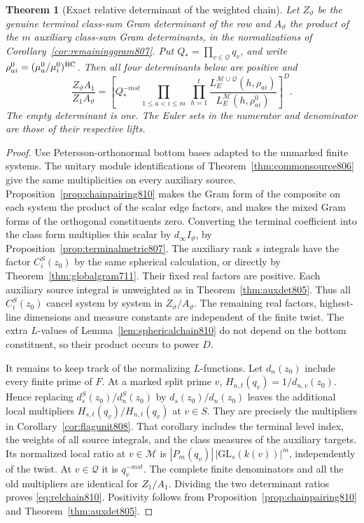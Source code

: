 \documentclass[a4paper,11pt]{article}
\newtheorem{theorem}[proposition]{Theorem}
\theoremstyle{definition}
\theoremstyle{remark}
\numberwithin{equation}{section}
\begin{document}
\begin{theorem}[Exact relative determinant of the weighted chain]
\leavevmode\label{thm:detquotient810}
Let \(Z_\vartheta\) be the genuine terminal class-sum Gram
determinant of the row and \(A_\vartheta\) the product of the
\(m\) auxiliary class-sum Gram determinants, in the
normalizations of Corollary~\ref{cor:remaininggram807}.
Put \(Q_*=\prod_{v\in\mathcal Q}q_v\), and write
\(\rho_{ai}^0=(\mu_a^0/\mu_i^0)^{\rm BC}\). Then all four
determinants below are positive and
\begin{equation}
 \frac{Z_\vartheta A_1}{Z_1 A_\vartheta}
  =\left[
      Q_*^{-mst}
      \prod_{1\leq a<i\leq m}\ \prod_{h=1}^{t}
       \frac{L_E^{\mathcal M\cup\mathcal Q}(h,\rho_{ai})}
            {L_E^{\mathcal M}(h,\rho_{ai}^0)}
    \right]^D .                                      \label{eq:relchain810}
\end{equation}
The empty determinant is one. The Euler sets in the numerator
and denominator are those of their respective lifts.
\end{theorem}
\begin{proof}
Use Petersson-orthonormal bottom bases adapted to the unmarked
finite systems. The unitary module identifications of
Theorem~\ref{thm:commonsource806} give the same multiplicities
on every auxiliary source. Proposition~\ref{prop:chainpairing810}
makes the Gram form of the composite on each system the
product of the scalar edge factors, and makes the mixed
Gram forms of the orthogonal constituents zero. Converting
the terminal coefficient into the class form multiplies this
scalar by \(d_\infty I_\vartheta\), by
Proposition~\ref{prop:terminalmetric807}. The auxiliary rank
\(s\) integrals have the factor \(C_i^S(z_0)\) by the same
spherical calculation, or directly by Theorem~\ref{thm:globalgram711}.
Their fixed real factors are positive. Each auxiliary source
integral is unweighted as in Theorem~\ref{thm:auxdet805}.
Thus all \(C_i^S(z_0)\) cancel system by system in
\(Z_\vartheta/A_\vartheta\). The remaining real factors,
highest-line dimensions and measure constants are independent
of the finite twist. The extra \(L\)-values of
Lemma~\ref{lem:sphericalchain810} do not depend on the bottom
constituent, so their product occurs to power \(D\).

It remains to keep track of the normalizing \(L\)-functions.
Let \(d_n(z_0)\) include every finite prime of \(F\). At a
marked split prime \(v\), \(H_{n,t}(q_v)=1/d_{n,v}(z_0)\).
Hence replacing \(d_s^S(z_0)/d_n^S(z_0)\) by
\(d_s(z_0)/d_n(z_0)\) leaves the additional local multipliers
\(H_{s,t}(q_v)/H_{n,t}(q_v)\) at \(v\in S\). They are precisely
the multipliers in Corollary~\ref{cor:flagunit808}. That
corollary includes the terminal level index, the weights of
all source integrals, and the class measures of the auxiliary
targets. Its normalized local ratio at \(v\in\mathcal M\) is
\(|P_m(q_v)|\,|\mathrm{GL}_s(k(v))|^m\), independently of the
twist. At \(v\in\mathcal Q\) it is \(q_v^{-mst}\).
The complete finite denominators and all the old multipliers
are identical for \(Z_1/A_1\). Dividing the two determinant
ratios proves \eqref{eq:relchain810}. Positivity follows from
Proposition~\ref{prop:chainpairing810} and
Theorem~\ref{thm:auxdet805}.
\end{proof}
\end{document}
